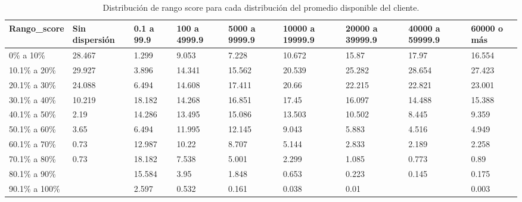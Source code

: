 \documentclass[../main.tex]{subfiles}
\begin{document}
\begin{table}[htb]
    \tiny
    \begin{tabular}{lllllllll}
        \hline
        Rango\_score   & Sin dispersión & 0.1 a 99.9 & 100 a 4999.9 & 5000 a 9999.9 & 10000 a 19999.9 & 20000 a 39999.9 & 40000 a 59999.9 & 60000 o más \\ \hline
        0\% a 10\%     & 28.467         & 1.299      & 9.053        & 7.228         & 10.672          & 15.87           & 17.97           & 16.554      \\
        10.1\% a 20\%  & 29.927         & 3.896      & 14.341       & 15.562        & 20.539          & 25.282          & 28.654          & 27.423      \\
        20.1\% a 30\%  & 24.088         & 6.494      & 14.608       & 17.411        & 20.66           & 22.215          & 22.821          & 23.001      \\
        30.1\% a 40\%  & 10.219         & 18.182     & 14.268       & 16.851        & 17.45           & 16.097          & 14.488          & 15.388      \\
        40.1\% a 50\%  & 2.19           & 14.286     & 13.495       & 15.086        & 13.503          & 10.502          & 8.445           & 9.359       \\
        50.1\% a 60\%  & 3.65           & 6.494      & 11.995       & 12.145        & 9.043           & 5.883           & 4.516           & 4.949       \\
        60.1\% a 70\%  & 0.73           & 12.987     & 10.22        & 8.707         & 5.144           & 2.833           & 2.189           & 2.258       \\
        70.1\% a 80\%  & 0.73           & 18.182     & 7.538        & 5.001         & 2.299           & 1.085           & 0.773           & 0.89        \\
        80.1\% a 90\%  &                & 15.584     & 3.95         & 1.848         & 0.653           & 0.223           & 0.145           & 0.175       \\
        90.1\% a 100\% &                & 2.597      & 0.532        & 0.161         & 0.038           & 0.01            &                 & 0.003       \\ \hline
    \end{tabular}
    \caption{Distribución de rango score para cada distribución del promedio disponible del cliente.}
\end{table}
\end{document}
